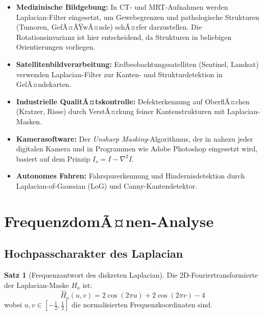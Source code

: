 ﻿\documentclass[a4paper,12pt]{article}
\theoremstyle{definition}
\newtheorem{satz}{Satz}
\begin{document}
\begin{itemize}
    \item \textbf{Medizinische Bildgebung:} In CT- und MRT-Aufnahmen werden Laplacian-Filter
          eingesetzt, um Gewebegrenzen und pathologische Strukturen (Tumoren, GefÃ¤ÃŸwÃ¤nde) schÃ¤rfer
          darzustellen. Die Rotationsinvarianz ist hier entscheidend, da Strukturen in beliebigen
          Orientierungen vorliegen.
    \item \textbf{Satellitenbildverarbeitung:} Erdbeobachtungssatelliten (Sentinel, Landsat)
          verwenden Laplacian-Filter zur Kanten- und Strukturdetektion in GelÃ¤ndekarten.
    \item \textbf{Industrielle QualitÃ¤tskontrolle:} Defekterkennung auf OberflÃ¤chen (Kratzer,
          Risse) durch VerstÃ¤rkung feiner Kantenstrukturen mit Laplacian-Masken.
    \item \textbf{Kamerasoftware:} Der \emph{Unsharp Masking}-Algorithmus, der in nahezu jeder
          digitalen Kamera und in Programmen wie Adobe Photoshop eingesetzt wird, basiert auf dem
          Prinzip $I_s = I - \nabla^2 I$.
    \item \textbf{Autonomes Fahren:} Fahrspurerkennung und Hindernisdetektion durch
          Laplacian-of-Gaussian (LoG) und Canny-Kantendetektor.
\end{itemize}

\section{FrequenzdomÃ¤nen-Analyse}

\subsection{Hochpasscharakter des Laplacian}

\begin{satz}[Frequenzantwort des diskreten Laplacian]
\label{satz:freq}
    Die 2D-Fouriertransformierte der Laplacian-Maske $H_a$ ist:
    \[
        \hat{H}_a(u,v) = 2\cos(2\pi u) + 2\cos(2\pi v) - 4
    \]
    wobei $u, v \in [-\frac{1}{2}, \frac{1}{2}]$ die normalisierten Frequenzkoordinaten sind.
\end{satz}
\end{document}
